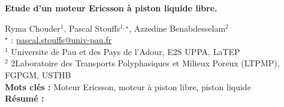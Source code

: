 


    \newpage

\BgThispage

%
\begin{flushleft}
\addtocounter{section}{1}
{\Large \textbf{Etude d'un moteur Ericsson à piston liquide libre.}}\label{ref:82}
\end{flushleft}
%
Ryma Chouder$^{1}$, Pascal Stouffs$^{1,\star}$, Azzedine Benabdesselam$^{2}$\\[2mm]
$^{\star}$ \Letter : \url{pascal.stouffs@univ-pau.fr}\\[2mm]
{\footnotesize $^{1}$ Universite de Pau et des Pays de l'Adour, E2S UPPA, LaTEP}\\
{\footnotesize $^{2}$ 2Laboratoire des Transports Polyphasiques et Milieux Poreux (LTPMP), FGPGM, USTHB}\\
[4mm]
%
\noindent \textbf{Mots clés : } Moteur Ericsson, moteur à piston libre, piston liquide\\[4mm]
%
\noindent \textbf{Résumé : } 

